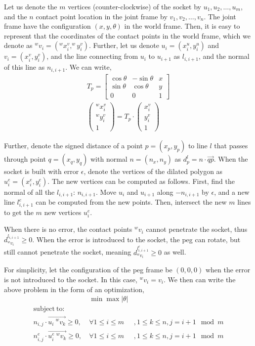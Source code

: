 \documentclass[11pt]{article}
\begin{document}
Let us denote the $m$ vertices (counter-clockwise) of the socket by $u_1, u_2, \ldots, u_m$, and the $n$ contact point location in the joint frame by $v_1, v_2, \ldots, v_n$. The joint frame have the configuration $(x, y, \theta)$ in the world frame. Then, it is easy to represent that the coordinates of the contact points in the world frame, which we denote as $^wv_i = (^wx^v_i, ^wy^v_i)$. Further, let us denote $u_i = (x^u_i, y^u_i)$ and $v_i = (x^v_i, y^v_i)$, and the line connecting from $u_i$ to $u_{i+1}$ as $l_{i, i+1}$, and the normal of this line as $n_{i, i+1}$. We can write, 
\begin{eqnarray}
T_p = \begin{bmatrix}
\cos\theta & -\sin\theta & x\\
\sin\theta & \cos\theta & y\\
0 & 0 & 1
\end{bmatrix}\\
\begin{pmatrix}
^wx^v_i \\ ^wy^v_i \\ 1
\end{pmatrix} = T_p\cdot\begin{pmatrix}
x^v_i \\ y^v_i \\ 1
\end{pmatrix}
\end{eqnarray}

Further, denote the signed distance of a point $p = (x_p, y_p)$ to line $l$ that passes through point $q = (x_q, y_q)$ with normal $n = (n_x, n_y)$ as $d^l_p = n\cdot \overrightarrow{qp}$. When the socket is built with error $\epsilon$, denote the vertices of the dilated polygon as $u^e_i = (x^e_i, y^e_i)$. The new vertices can be computed as follows. First, find the normal of all the $l_{i, i+1}$: $n_{i, i+1}$. Move $u_i$ and $u_{i+1}$ along $-n_{i, i+1}$ by $\epsilon$, and a new line $l^e_{i, i+1}$ can be computed from the new points. Then, intersect the new $m$ lines to get the $m$ new vertices $u^e_i$. 

When there is no error, the contact points $^wv_i$ cannot penetrate the socket, thus $d^{l_{i, i+1}}_{^wv_i} \geq 0$. When the error is introduced to the socket, the peg can rotate, but still cannot penetrate the socket, meaning $d^{l^e_{i, i+1}}_{^wv_i} \geq 0$ as well. 

For simplicity, let the configuration of the peg frame be $(0, 0, 0)$ when the error is not introduced to the socket. In this case, $^wv_i = v_i$. We then can write the above problem in the form of an optimization, 
\begin{eqnarray}
&\min\max |\theta|&\\
\mathrm{subject\ to: }&&\nonumber\\
n_{i, j}\cdot\overrightarrow{u_i\ ^wv_k} \geq 0,\ &\forall 1\leq i\leq m&, 1\leq k\leq n, j={i+1\mod m}\label{eq:no_error_constraint}\\
n^e_{i, j}\cdot\overrightarrow{u^{e}_{i}\ ^wv_k} \geq 0,\ &\forall 1\leq i\leq m&, 1\leq k\leq n, j={i+1\mod m}\label{eq:error_constraint}
\end{eqnarray}
\end{document}

